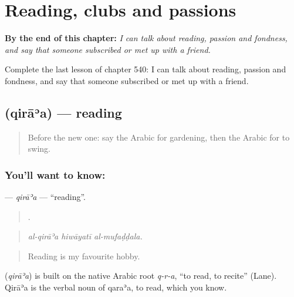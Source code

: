 
\chapter{Reading, clubs and passions}
\label{ch:ar-reading-clubs-and-passions}

\begin{chapteropening}
\textbf{By the end of this chapter:} \emph{I can talk about reading, passion and fondness, and say that someone subscribed or met up with a friend.}

Complete the last lesson of chapter 540: I can talk about reading, passion and fondness, and say that someone subscribed or met up with a friend.
\end{chapteropening}

\section[\texorpdfstring{\ar{قراءة} (qirāʾa)}{قراءة (qirāʾa)}]{ (qirāʾa) — reading}

\label{lesson:AR-C540-qiraa}



\begin{quote}
Before the new one: say the Arabic for gardening, then the Arabic for to swing.
\end{quote}

\subsection*{You'll want to know: }
\textbf{} — \emph{qirāʾa} — \textquotedblleft{}reading\textquotedblright{}.

\begin{quote}
  .
\end{quote}

\begin{quote}
\emph{al-qirāʾa hiwāyatī al-mufaḍḍala.}
\end{quote}

\begin{quote}
Reading is my favourite hobby.
\end{quote}

\begin{cousinweb}
\textbf{} (\emph{qirāʾa}) is built on the native Arabic root \emph{q-r-a}, \textquotedblleft{}to read, to recite\textquotedblright{} (Lane). Qirāʾa is the verbal noun of qaraʾa, to read, which you know.
\end{cousinweb}

